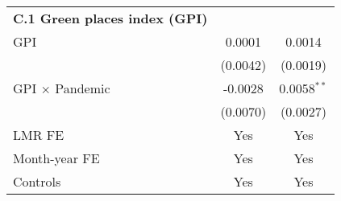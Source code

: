 {\begin{tabular}{lcc}
      \textbf{C.1 Green places index (GPI)}\\
      \hspace{0.5cm} GPI                                       & 0.0001  				& 0.0014           \\
      \hspace{0.5cm}                                           & (0.0042)        		& (0.0019)                 \\
      \hspace{0.5cm} GPI $\times$ Pandemic                     & -0.0028          		& 0.0058$^{**}$                 \\
      \hspace{0.5cm}                                           & (0.0070)        		& (0.0027)                 \\
      \hline
      LMR FE                                    & Yes             & Yes                     \\
      Month-year FE                             & Yes             & Yes                     \\
      Controls                                  & Yes             & Yes                     \\
    \hline\hline
\end{tabular}
}
